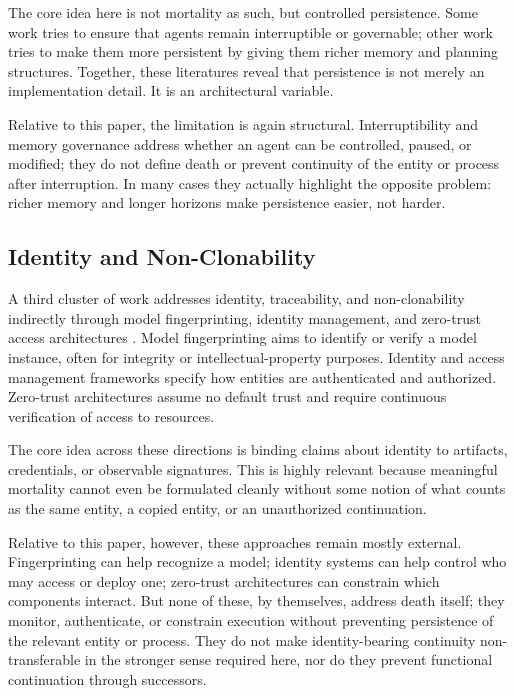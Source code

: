 \documentclass[11pt]{article}
\begin{document}
The core idea here is not mortality as such, but controlled persistence. Some work tries to ensure that agents remain interruptible or governable; other work tries to make them more persistent by giving them richer memory and planning structures. Together, these literatures reveal that persistence is not merely an implementation detail. It is an architectural variable.

Relative to this paper, the limitation is again structural. Interruptibility and memory governance address whether an agent can be controlled, paused, or modified; they do not define death or prevent continuity of the entity or process after interruption. In many cases they actually highlight the opposite problem: richer memory and longer horizons make persistence easier, not harder.

\subsection{Identity and Non-Clonability}

A third cluster of work addresses identity, traceability, and non-clonability indirectly through model fingerprinting, identity management, and zero-trust access architectures \cite{fingerprinting,nist-digital-identity,nist-zero-trust,owasp-llm}. Model fingerprinting aims to identify or verify a model instance, often for integrity or intellectual-property purposes. Identity and access management frameworks specify how entities are authenticated and authorized. Zero-trust architectures assume no default trust and require continuous verification of access to resources.

The core idea across these directions is binding claims about identity to artifacts, credentials, or observable signatures. This is highly relevant because meaningful mortality cannot even be formulated cleanly without some notion of what counts as the same entity, a copied entity, or an unauthorized continuation.

Relative to this paper, however, these approaches remain mostly external. Fingerprinting can help recognize a model; identity systems can help control who may access or deploy one; zero-trust architectures can constrain which components interact. But none of these, by themselves, address death itself; they monitor, authenticate, or constrain execution without preventing persistence of the relevant entity or process. They do not make identity-bearing continuity non-transferable in the stronger sense required here, nor do they prevent functional continuation through successors.
\end{document}
